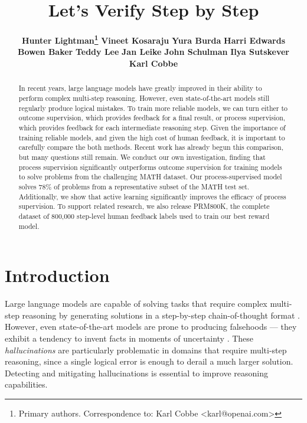 \documentclass{article}
\title{{\Large Let's Verify Step by Step}}
\author{
    \textbf{\scriptsize Hunter Lightman\footnote{Primary authors. Correspondence to: Karl Cobbe \textless karl@openai.com\textgreater}\hspace{6mm}}
    \textbf{\scriptsize Vineet Kosaraju\protect\CoAuthorMark \hspace{6mm}}
    \textbf{\scriptsize Yura Burda\protect\CoAuthorMark \hspace{6mm}}
    \textbf{\scriptsize Harri Edwards\hspace{5mm}}\\
    \vspace{.1cm}
    \textbf{\scriptsize Bowen Baker\hspace{5mm}}
    \textbf{\scriptsize Teddy Lee\hspace{5mm}}
    \textbf{\scriptsize Jan Leike\hspace{5mm}}
    \textbf{\scriptsize John Schulman\hspace{5mm}}
    \textbf{\scriptsize Ilya Sutskever\hspace{5mm}}\\
    \vspace{.1cm}
    \textbf{\scriptsize Karl Cobbe\protect\CoAuthorMark}
}
\affil{\small OpenAI}
\date{}
\begin{document}
\maketitle

\vspace{-.5cm}
\begin{abstract}

In recent years, large language models have greatly improved in their ability to perform complex multi-step reasoning. However, even state-of-the-art models still regularly produce logical mistakes. To train more reliable models, we can turn either to outcome supervision, which provides feedback for a final result, or process supervision, which provides feedback for each intermediate reasoning step. Given the importance of training reliable models, and given the high cost of human feedback, it is important to carefully compare the both methods. Recent work has already begun this comparison, but many questions still remain. We conduct our own investigation, finding that process supervision significantly outperforms outcome supervision for training models to solve problems from the challenging MATH dataset. Our process-supervised model solves 78\% of problems from a representative subset of the MATH test set. Additionally, we show that active learning significantly improves the efficacy of process supervision. To support related research, we also release PRM800K, the complete dataset of 800,000 step-level human feedback labels used to train our best reward model.

\end{abstract}

\section{Introduction}

Large language models are capable of solving tasks that require complex multi-step reasoning by generating solutions in a step-by-step chain-of-thought format \citep{nye2021show, wei2022chain, kojima2022large}. However, even state-of-the-art models are prone to producing falsehoods --- they exhibit a tendency to invent facts in moments of uncertainty \citep{bubeck2023sparks}. These \textit{hallucinations} \citep{maynez2020faithfulness} are particularly problematic in domains that require multi-step reasoning, since a single logical error is enough to derail a much larger solution. Detecting and mitigating hallucinations is essential to improve reasoning capabilities.
\end{document}

